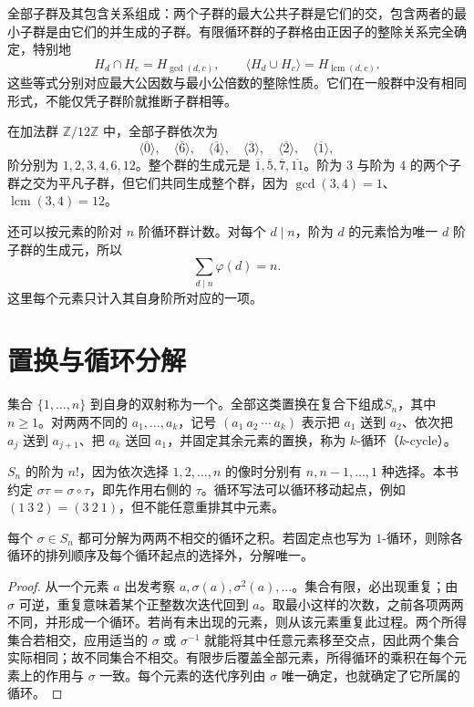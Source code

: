 \documentclass[UTF8,12pt,a4paper,fontset=fandol]{ctexbook}
\begin{document}
全部子群及其包含关系组成：两个子群的最大公共子群是它们的交，包含两者的最小子群是由它们的并生成的子群。有限循环群的子群格由正因子的整除关系完全确定，特别地
\[
  H_d\cap H_c=H_{\gcd(d,c)},\qquad
  \langle H_d\cup H_c\rangle=H_{\operatorname{lcm}(d,c)}.
\]
这些等式分别对应最大公因数与最小公倍数的整除性质。它们在一般群中没有相同形式，不能仅凭子群阶就推断子群相等。

\begin{example}[十二阶循环群]
在加法群 $\mathbb Z/12\mathbb Z$ 中，全部子群依次为
\[
  \langle\overline0\rangle,\quad\langle\overline6\rangle,\quad
  \langle\overline4\rangle,\quad\langle\overline3\rangle,\quad
  \langle\overline2\rangle,\quad\langle\overline1\rangle,
\]
阶分别为 $1,2,3,4,6,12$。整个群的生成元是 $\overline1,\overline5,\overline7,\overline{11}$。阶为 $3$ 与阶为 $4$ 的两个子群之交为平凡子群，但它们共同生成整个群，因为 $\gcd(3,4)=1$、$\operatorname{lcm}(3,4)=12$。
\end{example}

还可以按元素的阶对 $n$ 阶循环群计数。对每个 $d\mid n$，阶为 $d$ 的元素恰为唯一 $d$ 阶子群的生成元，所以
\begin{equation}\label{eq:totient-divisor-sum}
  \sum_{d\mid n}\varphi(d)=n.
\end{equation}
这里每个元素只计入其自身阶所对应的一项。

\section{置换与循环分解}\label{sec:permutation-cycles}

\begin{definition}[对称群与循环]
集合 $\{1,\ldots,n\}$ 到自身的双射称为一个。全部这类置换在复合下组成$S_n$，其中 $n\geq1$。对两两不同的 $a_1,\ldots,a_k$，记号 $(a_1\ a_2\ \cdots\ a_k)$ 表示把 $a_1$ 送到 $a_2$、依次把 $a_j$ 送到 $a_{j+1}$、把 $a_k$ 送回 $a_1$，并固定其余元素的置换，称为 $k$-循环（$k$-cycle）。
\end{definition}

$S_n$ 的阶为 $n!$，因为依次选择 $1,2,\ldots,n$ 的像时分别有 $n,n-1,\ldots,1$ 种选择。本书约定 $\sigma\tau=\sigma\circ\tau$，即先作用右侧的 $\tau$。循环写法可以循环移动起点，例如 $(1\ 3\ 2)=(3\ 2\ 1)$，但不能任意重排其中元素。

\begin{theorem}[不相交循环分解]\label{thm:disjoint-cycles}
每个 $\sigma\in S_n$ 都可分解为两两不相交的循环之积。若固定点也写为 $1$-循环，则除各循环的排列顺序及每个循环起点的选择外，分解唯一。
\end{theorem}
\begin{proof}
从一个元素 $a$ 出发考察 $a,\sigma(a),\sigma^2(a),\ldots$。集合有限，必出现重复；由 $\sigma$ 可逆，重复意味着某个正整数次迭代回到 $a$。取最小这样的次数，之前各项两两不同，并形成一个循环。若尚有未出现的元素，则从该元素重复此过程。两个所得集合若相交，应用适当的 $\sigma$ 或 $\sigma^{-1}$ 就能将其中任意元素移至交点，因此两个集合实际相同；故不同集合不相交。有限步后覆盖全部元素，所得循环的乘积在每个元素上的作用与 $\sigma$ 一致。每个元素的迭代序列由 $\sigma$ 唯一确定，也就确定了它所属的循环。
\end{proof}
\end{document}
